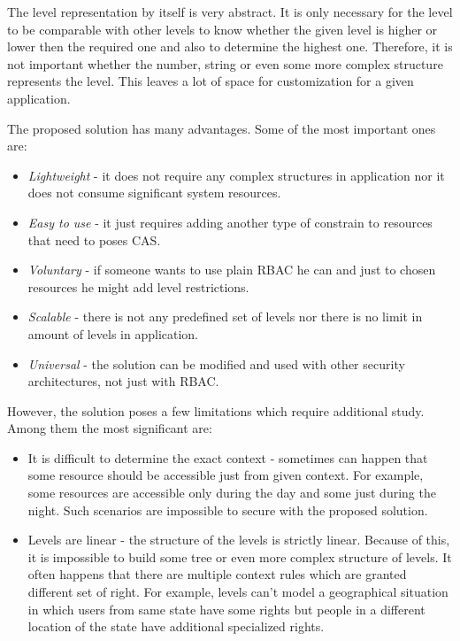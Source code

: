 \documentclass{sig-alternate}
\begin{document}
The level representation by itself is very abstract. It is only necessary for the level to be comparable with other levels to know whether the given level is higher or lower then the required one and also to determine the highest one. Therefore, it is not important whether the number, string or even some more complex structure represents the level. This leaves a lot of space for customization for a given application.

The proposed solution has many advantages. Some of the most important ones are:

\begin{itemize}  
\setlength{\itemsep}{1pt}
	 \setlength{\parskip}{0pt}
  \setlength{\parsep}{0pt}
  \item {\em Lightweight} - it does not require any complex structures in application nor it does not consume significant system resources. 
  \item {\em Easy to use} - it just requires adding another type of constrain to resources that need to poses CAS.
  
  \item {\em Voluntary} - if someone wants to use plain RBAC he can and just to chosen resources he might add level restrictions. 
  
  \item {\em Scalable} - there is not any predefined set of levels nor there is no limit in amount of levels in application.
  
  \item {\em Universal} - the solution can be modified and used with other security architectures, not just with RBAC.
\end{itemize}

However, the solution poses a few limitations which require additional study. Among them the most significant are:
\begin{itemize}
		\setlength{\itemsep}{1pt}
	 \setlength{\parskip}{0pt}
  \setlength{\parsep}{0pt}

  \item It is difficult to determine the exact context - sometimes can happen that some resource should be accessible just from given context. For example, some resources are accessible only during the day and some just during the night. Such scenarios are impossible to secure with the proposed solution.
  
  \item Levels are linear - the structure of the levels is strictly linear.  Because of this, it is impossible to build some tree or even more complex structure of levels. It often happens that there are multiple context rules which are granted different set of right. For example, levels can't model a geographical situation in which users from same state have some rights but people in a different location of the state have additional specialized rights.
\end{itemize}
\end{document}
